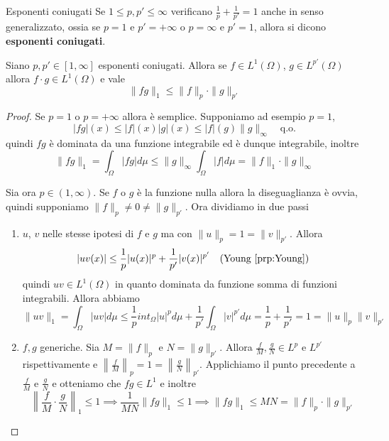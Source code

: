 \begin{definition}[label=def:coniugati]{Esponenti coniugati}
    Se \(1 \le p, p' \le \infty\) verificano \(\frac{1}{p} + \frac{1}{p'} = 1\)
    anche in senso generalizzato, ossia se \(p = 1\) e \(p' = +\infty\) o \(p =
    \infty \) e \(p' = 1\), allora si dicono \textbf{esponenti coniugati}.
\end{definition}

\begin{theorem}
    Siano \(p, p' \in [1, \infty]\) esponenti coniugati. Allora se \(f \in
    L^{1}{(\Omega)}\), \(g \in L^{p'}{(\Omega)}\) allora \(f\cdot g \in
    L^{1}{(\Omega)}\) e vale
    \[
        \|fg\|_1 \le \|f\|_p \cdot \|g\|_{p'}
    \]
\end{theorem}
\begin{proof}
    Se \(p = 1\) o \(p = +\infty\) allora è semplice. Supponiamo
    ad esempio \(p = 1\), 
    \[
        |fg|{(x)} \le |f|{(x)}|g|{(x)} \le |f|{(g)} \|g\|_{\infty} \quad \text{
        q.o.}
    \]
    quindi \(fg\) è dominata da una funzione integrabile ed è dunque
    integrabile, inoltre
    \[
        \|fg\|_1 = \int_\Omega |fg| d\mu \le \|g\|_\infty \int_\Omega |f| d\mu = \|f\|_1 \cdot \|g\|_\infty
    \]

    Sia ora \(p \in (1, \infty)\). Se \(f\) o \(g\) è la funzione nulla allora
    la diseguaglianza è ovvia, quindi supponiamo \(\|f\|_p \neq 0 \neq
    \|g\|_{p'} \). Ora dividiamo in due passi
\begin{enumerate}[label = \arabic*.]
    \item \(u\), \(v\) nelle stesse ipotesi di \(f\) e \(g\) ma con \(\|u\|_p =
        1 = \|v\|_{p'} \). Allora
        \[
            |uv{(x)}| \le  \frac{1}{p}|u{(x)}|^{p} + \frac{1}{ p' }|v{(x)}|^{p'}
            \quad \text{(Young~\ref{prp:Young})}
        \]
        quindi \(uv \in L^{1}(\Omega)\) in quanto dominata da funzione somma di
        funzioni integrabili. Allora abbiamo
        \[
            \|uv\|_1 = \int_\Omega |uv| d\mu \le \frac{1}{p} int_\Omega |u|^{p} d\mu +
            \frac{1}{p'} \int_\Omega |v|^{p'} d\mu = \frac{1}{p} + \frac{1}{p'}
            = 1 = \|u\|_p \|v\|_{p'}
        \]
    \item \(f, g\) generiche. Sia \(M = \|f\|_p\) e \(N = \|g\|_{p'}\). Allora
        \(\frac{f}{M}, \frac{g}{N} \in L^{p}\) e \(L^{p'}\) rispettivamente e
        \(\left\| \frac{f}{M} \right\|_p = 1 = \left\| \frac{g}{N} \right\|_{p'}\).
        Applichiamo il punto precedente a \(\frac{f}{M}\) e \(\frac{g}{N}\) e
        otteniamo che \(fg \in L^{1}\) e inoltre
        \[
            \left\| \frac{f}{M} \cdot \frac{g}{N} \right\|_1 \le 1 \implies
            \frac{1}{MN} \|fg\|_1 \le 1 \implies \|fg\|_1 \le MN = \|f\|_p \cdot
            \|g\|_{p'}
        \]
\end{enumerate}
\end{proof}

